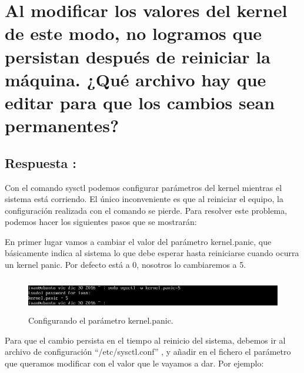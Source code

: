 \maketitle %

\newpage %

\tableofcontents %

\listoffigures

\listoftables

\newpage

\section{Al modificar los valores del kernel de este modo, no logramos que persistan después de reiniciar la máquina. ¿Qué archivo hay que editar para que los cambios sean permanentes?}
\subsection{Respuesta : }
Con el comando sysctl \cite{SYSCTL} podemos configurar parámetros del kernel mientras el sistema está corriendo. El único inconveniente es que al reiniciar el equipo, la configuración realizada con el comando se pierde. Para resolver este problema, podemos hacer los siguientes pasos que se mostrarán:

En primer lugar vamos a cambiar el valor del parámetro kernel.panic, que básicamente indica al sistema lo que debe esperar hasta reiniciarse cuando ocurra un kernel panic. Por defecto está a 0, nosotros lo cambiaremos a 5.

\begin{figure}[H]
	\begin{center}
		\includegraphics[width=15cm, height=1.5cm]{Imagenes/Indicando_valor_kernel_panic}
		\caption{Configurando el parámetro kernel.panic.}
		\label{fig:2}
	\end{center}
\end{figure}

Para que el cambio persista en el tiempo al reinicio del sistema, debemos ir al archivo de configuración ``/etc/sysctl.conf'' \cite{SYSCTL.CONF}, y añadir en el fichero el parámetro que queramos modificar con el valor que le vayamos a dar. Por ejemplo:

